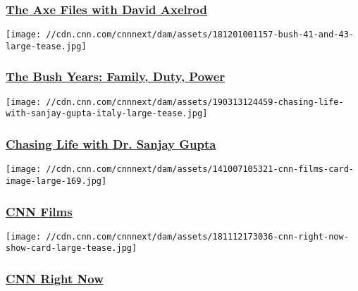 \hypertarget{the-axe-files-with-david-axelrod}{%
\subsubsection{\texorpdfstring{\href{/specials/politics/axe-files}{The
Axe Files with David
Axelrod}}{The Axe Files with David Axelrod}}\label{the-axe-files-with-david-axelrod}}

\href{/shows/the-bush-years}{}

\texttt{[image: //cdn.cnn.com/cnnnext/dam/assets/181201001157-bush-41-and-43-large-tease.jpg]}

\hypertarget{the-bush-years-family-duty-power}{%
\subsubsection{\texorpdfstring{\href{/shows/the-bush-years}{The Bush
Years: Family, Duty,
Power}}{The Bush Years: Family, Duty, Power}}\label{the-bush-years-family-duty-power}}

\href{/shows/chasing-life}{}

\texttt{[image: //cdn.cnn.com/cnnnext/dam/assets/190313124459-chasing-life-with-sanjay-gupta-italy-large-tease.jpg]}

\hypertarget{chasing-life-with-dr-sanjay-gupta}{%
\subsubsection{\texorpdfstring{\href{/shows/chasing-life}{Chasing Life
with Dr. Sanjay
Gupta}}{Chasing Life with Dr. Sanjay Gupta}}\label{chasing-life-with-dr-sanjay-gupta}}

\href{/shows/cnn-films}{}

\texttt{[image: //cdn.cnn.com/cnnnext/dam/assets/141007105321-cnn-films-card-image-large-169.jpg]}

\hypertarget{cnn-films}{%
\subsubsection{\texorpdfstring{\href{/shows/cnn-films}{CNN
Films}}{CNN Films}}\label{cnn-films}}

\href{/shows/cnn-right-now}{}

\texttt{[image: //cdn.cnn.com/cnnnext/dam/assets/181112173036-cnn-right-now-show-card-large-tease.jpg]}

\hypertarget{cnn-right-now}{%
\subsubsection{\texorpdfstring{\href{/shows/cnn-right-now}{CNN Right
Now}}{CNN Right Now}}\label{cnn-right-now}}

